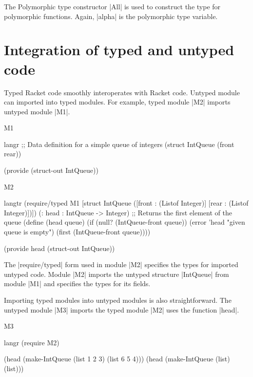 \noindent
The Polymorphic type constructor \scheme|All| is used to construct the
type for polymorphic functions. Again, \scheme|alpha| is the polymorphic
type variable.

\section{Integration of typed and untyped code}

Typed Racket code smoothly interoperates with Racket code. Untyped
module can imported into typed modules. For example, typed module
\scheme|M2| imports untyped module \scheme|M1|.

\begin{file}{M1}
\begin{schemedisplay}

  langr
  ;; Data definition for a simple queue of integers
  (struct IntQueue
    (front rear))

  (provide (struct-out IntQueue))
\end{schemedisplay}
\end{file}

\begin{file}{M2}
\begin{schemedisplay}
  langtr
  (require/typed M1 [struct IntQueue ([front : (Listof Integer)]
                                      [rear  : (Listof Integer)])])
  (: head : IntQueue -> Integer)
  ;; Returns the first element of the queue
  (define (head queue)
    (if (null? (IntQueue-front queue))
        (error 'head "given queue is empty")
        (first (IntQueue-front queue))))

  (provide head (struct-out IntQueue))
\end{schemedisplay}
\end{file}

The \scheme|require/typed| form used in module \scheme|M2| specifies the
types for imported untyped code. Module \scheme|M2| imports the untyped
structure \scheme|IntQueue| from module \scheme|M1| and specifies the
types for its fields.

Importing typed modules into untyped modules is also straightforward.
The untyped module \scheme|M3| imports the typed module \scheme|M2| uses
the function \scheme|head|.

\begin{file}{M3}
\begin{schemedisplay}

  langr
  (require M2)

  (head (make-IntQueue (list 1 2 3) (list 6 5 4)))
  (head (make-IntQueue (list) (list)))

\end{schemedisplay}
\end{file}


